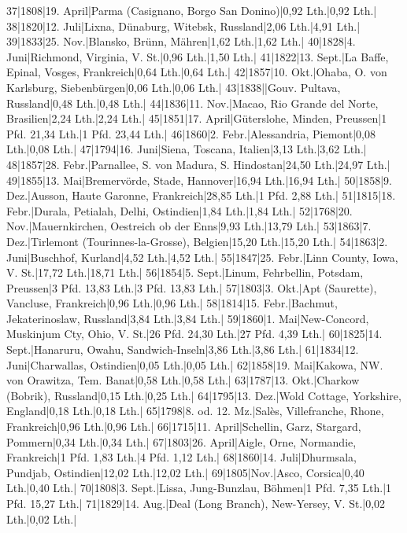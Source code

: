 \documentclass[a4paper, 11pt, oneside]{article}
\begin{document}
37|1808|19. April|Parma (Casignano, Borgo San Donino)|0,92 Lth.|0,92 Lth.|  
38|1820|12. Juli|Lixna, Dünaburg, Witebsk, Russland|2,06 Lth.|4,91 Lth.|  
39|1833|25. Nov.|Blansko, Brünn, Mähren|1,62 Lth.|1,62 Lth.|  
40|1828|4. Juni|Richmond, Virginia, V. St.|0,96 Lth.|1,50 Lth.|  
41|1822|13. Sept.|La Baffe, Epinal, Vosges, Frankreich|0,64 Lth.|0,64 Lth.|  
42|1857|10. Okt.|Ohaba, O. von Karlsburg, Siebenbürgen|0,06 Lth.|0,06 Lth.|  
43|1838||Gouv. Pultava, Russland|0,48 Lth.|0,48 Lth.|  
44|1836|11. Nov.|Macao, Rio Grande del Norte, Brasilien|2,24 Lth.|2,24 Lth.|  
45|1851|17. April|Güterslohe, Minden, Preussen|1 Pfd. 21,34 Lth.|1 Pfd. 23,44 Lth.|  
46|1860|2. Febr.|Alessandria, Piemont|0,08 Lth.|0,08 Lth.|  
47|1794|16. Juni|Siena, Toscana, Italien|3,13 Lth.|3,62 Lth.|  
48|1857|28. Febr.|Parnallee, S. von Madura, S. Hindostan|24,50 Lth.|24,97 Lth.|  
49|1855|13. Mai|Bremervörde, Stade, Hannover|16,94 Lth.|16,94 Lth.|  
50|1858|9. Dez.|Ausson, Haute Garonne, Frankreich|28,85 Lth.|1 Pfd. 2,88 Lth.|  
51|1815|18. Febr.|Durala, Petialah, Delhi, Ostindien|1,84 Lth.|1,84 Lth.|  
52|1768|20. Nov.|Mauernkirchen, Oestreich ob der Enns|9,93 Lth.|13,79 Lth.|  
53|1863|7. Dez.|Tirlemont (Tourinnes-la-Grosse), Belgien|15,20 Lth.|15,20 Lth.|  
54|1863|2. Juni|Buschhof, Kurland|4,52 Lth.|4,52 Lth.|  
55|1847|25. Febr.|Linn County, Iowa, V. St.|17,72 Lth.|18,71 Lth.|  
56|1854|5. Sept.|Linum, Fehrbellin, Potsdam, Preussen|3 Pfd. 13,83 Lth.|3 Pfd. 13,83 Lth.|  
57|1803|3. Okt.|Apt (Saurette), Vancluse, Frankreich|0,96 Lth.|0,96 Lth.|  
58|1814|15. Febr.|Bachmut, Jekaterinoslaw, Russland|3,84 Lth.|3,84 Lth.|  
59|1860|1. Mai|New-Concord, Muskinjum Cty, Ohio, V. St.|26 Pfd. 24,30 Lth.|27 Pfd. 4,39 Lth.|  
60|1825|14. Sept.|Hanaruru, Owahu, Sandwich-Inseln|3,86 Lth.|3,86 Lth.|  
61|1834|12. Juni|Charwallas, Ostindien|0,05 Lth.|0,05 Lth.|  
62|1858|19. Mai|Kakowa, NW. von Orawitza, Tem. Banat|0,58 Lth.|0,58 Lth.|  
63|1787|13. Okt.|Charkow (Bobrik), Russland|0,15 Lth.|0,25 Lth.|  
64|1795|13. Dez.|Wold Cottage, Yorkshire, England|0,18 Lth.|0,18 Lth.|  
65|1798|8. od. 12. Mz.|Salès, Villefranche, Rhone, Frankreich|0,96 Lth.|0,96 Lth.|  
66|1715|11. April|Schellin, Garz, Stargard, Pommern|0,34 Lth.|0,34 Lth.|  
67|1803|26. April|Aigle, Orne, Normandie, Frankreich|1 Pfd. 1,83 Lth.|4 Pfd. 1,12 Lth.|  
68|1860|14. Juli|Dhurmsala, Pundjab, Ostindien|12,02 Lth.|12,02 Lth.|  
69|1805|Nov.|Asco, Corsica|0,40 Lth.|0,40 Lth.|  
70|1808|3. Sept.|Lissa, Jung-Bunzlau, Böhmen|1 Pfd. 7,35 Lth.|1 Pfd. 15,27 Lth.|  
71|1829|14. Aug.|Deal (Long Branch), New-Yersey, V. St.|0,02 Lth.|0,02 Lth.|  
\end{document}
